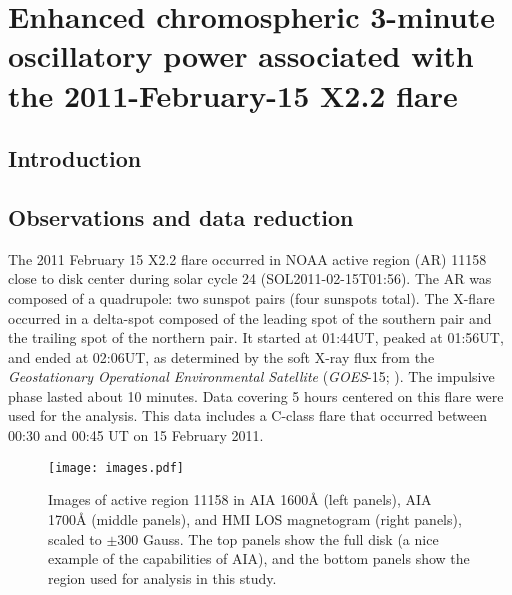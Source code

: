 \section{%
Enhanced chromospheric 3-minute oscillatory power associated with
the 2011-February-15 X2.2 flare}


\subsection{Introduction}


\subsection{Observations and data reduction}



The 2011 February 15 X2.2 flare
occurred in NOAA active region (AR) 11158
close to disk center
during solar cycle 24 (SOL2011-02-15T01:56).
The AR was composed of a quadrupole:
two sunspot pairs (four sunspots total).
The X-flare occurred in a delta-spot composed of
the leading spot of the southern pair and
the trailing spot of the northern pair.
It started at 01:44UT, peaked at 01:56UT, and ended at 02:06UT,
as determined by the soft X-ray flux from the
\textit{Geostationary Operational Environmental Satellite}
(\textit{GOES}-15; \cite{Viereck2007}).
The impulsive phase lasted about 10 minutes.
Data covering 5 hours centered on this flare were used for the analysis.
This data includes a C-class flare that occurred between 00:30 and 00:45 UT
on 15 February 2011.



\begin{figure*}[htb!]\centering
    \texttt{[image: images.pdf]}
    \caption{
        Images of active region 11158 in AIA 1600\AA{} (left panels),
        AIA 1700\AA{} (middle panels), and HMI LOS magnetogram (right panels),
        scaled to $\pm300$ Gauss.
        The top panels show the full disk
        (a nice example of the capabilities of AIA),
        and the bottom panels show the region used for analysis in this study.
        \label{images}}
\end{figure*}

